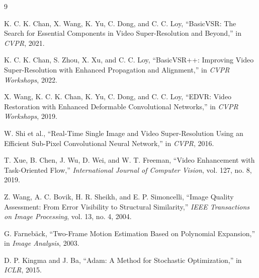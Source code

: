\documentclass[10pt]{article}
\begin{document}
\begin{thebibliography}{9}
\small

K. C. K. Chan, X. Wang, K. Yu, C. Dong, and C. C. Loy,
``BasicVSR: The Search for Essential Components in Video
Super-Resolution and Beyond,'' in \emph{CVPR}, 2021.

K. C. K. Chan, S. Zhou, X. Xu, and C. C. Loy,
``BasicVSR++: Improving Video Super-Resolution with Enhanced Propagation
and Alignment,'' in \emph{CVPR Workshops}, 2022.

X. Wang, K. C. K. Chan, K. Yu, C. Dong, and C. C. Loy,
``EDVR: Video Restoration with Enhanced Deformable Convolutional
Networks,'' in \emph{CVPR Workshops}, 2019.

W. Shi et al.,
``Real-Time Single Image and Video Super-Resolution Using an Efficient
Sub-Pixel Convolutional Neural Network,'' in \emph{CVPR}, 2016.

T. Xue, B. Chen, J. Wu, D. Wei, and W. T. Freeman,
``Video Enhancement with Task-Oriented Flow,''
\emph{International Journal of Computer Vision}, vol. 127, no. 8, 2019.

Z. Wang, A. C. Bovik, H. R. Sheikh, and E. P. Simoncelli,
``Image Quality Assessment: From Error Visibility to Structural
Similarity,'' \emph{IEEE Transactions on Image Processing}, vol. 13,
no. 4, 2004.

G. Farneb\"ack,
``Two-Frame Motion Estimation Based on Polynomial Expansion,'' in
\emph{Image Analysis}, 2003.

D. P. Kingma and J. Ba,
``Adam: A Method for Stochastic Optimization,'' in \emph{ICLR}, 2015.

\end{thebibliography}
\end{document}
